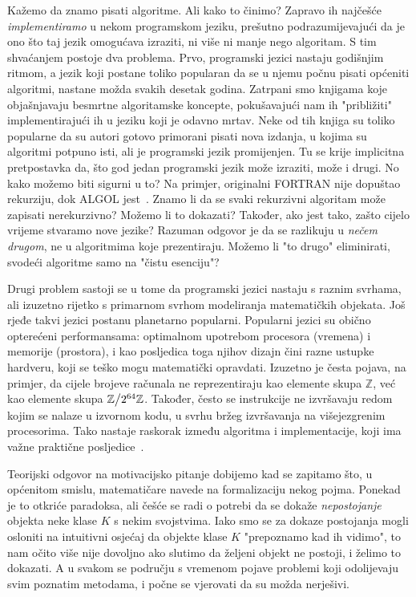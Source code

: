 Kažemo da znamo pisati algoritme. Ali kako to činimo? Zapravo ih najčešće \emph{implementiramo} u nekom programskom jeziku, prešutno podrazumijevajući da je ono što taj jezik omogućava izraziti, ni više ni manje nego algoritam. S tim shvaćanjem postoje dva problema. Prvo, programski jezici nastaju godišnjim ritmom, a jezik koji postane toliko popularan da se u njemu počnu pisati općeniti algoritmi, nastane možda svakih desetak godina. Zatrpani smo knjigama koje objašnjavaju besmrtne algoritamske koncepte, pokušavajući nam ih "približiti" implementirajući ih u jeziku koji je odavno mrtav. Neke od tih knjiga su toliko popularne da su autori gotovo primorani pisati nova izdanja, u kojima su algoritmi potpuno isti, ali je programski jezik promijenjen. Tu se krije implicitna pretpostavka da, što god jedan programski jezik može izraziti, može i drugi. No kako možemo biti sigurni u to? Na primjer, originalni FORTRAN nije dopuštao rekurziju, dok ALGOL jest~\cite{url:recursionAlgol}. Znamo li da se svaki rekurzivni algoritam može zapisati nerekurzivno? Možemo li to dokazati? Također, ako jest tako, zašto cijelo vrijeme stvaramo nove jezike? Razuman odgovor je da se razlikuju u \emph{nečem drugom}, ne u algoritmima koje prezentiraju. Možemo li "to drugo" eliminirati, svodeći algoritme samo na "čistu esenciju"?

Drugi problem sastoji se u tome da programski jezici nastaju s raznim svrhama, ali izuzetno rijetko s primarnom svrhom modeliranja matematičkih objekata. Još rjeđe takvi jezici postanu planetarno popularni. Popularni jezici su obično opterećeni performansama: optimalnom upotrebom procesora (vremena) i memorije (prostora), i kao posljedica toga njihov dizajn čini razne ustupke hardveru, koji se teško mogu matematički opravdati. Izuzetno je česta pojava, na primjer, da cijele brojeve računala ne reprezentiraju kao elemente skupa $\mathbb Z$, već kao elemente skupa $\mathbb Z\big\slash2^{64}\mathbb Z$. Također, često se instrukcije ne izvršavaju redom kojim se nalaze u izvornom kodu, u svrhu bržeg izvršavanja na višejezgrenim procesorima. Tako nastaje raskorak između algoritma i implementacije, koji ima važne praktične posljedice~\cite{url:wrongBinsearch}.

Teorijski odgovor na motivacijsko pitanje dobijemo kad se zapitamo što, u općenitom smislu, matematičare navede na formalizaciju nekog pojma. Ponekad je to otkriće paradoksa, ali češće se radi o potrebi da se dokaže \emph{nepostojanje} objekta neke klase $K$ s nekim svojstvima. Iako smo se za dokaze postojanja mogli osloniti na intuitivni osjećaj da objekte klase $K$ "prepoznamo kad ih vidimo", to nam očito više nije dovoljno ako slutimo da željeni objekt ne postoji, i želimo to dokazati. A u svakom se području s vremenom pojave problemi koji odolijevaju svim poznatim metodama, i počne se vjerovati da su možda nerješivi.


